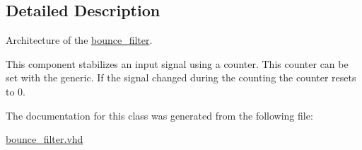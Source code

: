 \subsection{Detailed Description}
Architecture of the \hyperlink{classbounce__filter}{bounce\-\_\-filter}. 

This component stabilizes an input signal using a counter. This counter can be set with the generic. If the signal changed during the counting the counter resets to 0. 

The documentation for this class was generated from the following file\-:\begin{DoxyCompactItemize}
\item 
\hyperlink{bounce__filter_8vhd}{bounce\-\_\-filter.\-vhd}\end{DoxyCompactItemize}
